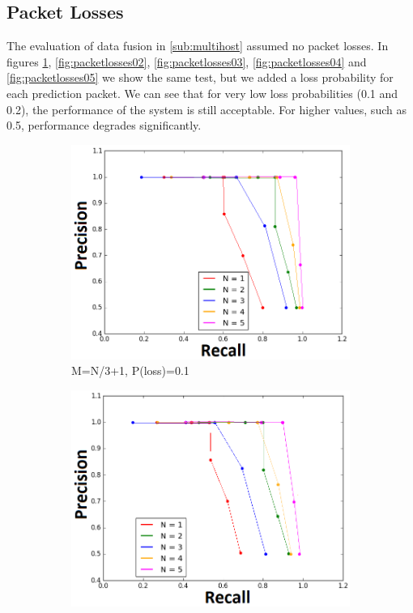 \documentclass[10pt,conference,compsocconf]{IEEEtran}
\begin{document}
\begin{enumerate}
\subsection{Packet Losses}
The evaluation of data fusion in \ref{sub:multihost} assumed no packet losses. In figures \ref{fig:packetlosses01}, \ref{fig:packetlosses02}, \ref{fig:packetlosses03}, \ref{fig:packetlosses04} and \ref{fig:packetlosses05} we show the same test, but we added a loss probability for each prediction packet. We can see that for very low loss probabilities (0.1 and 0.2), the performance of the system is still acceptable. For higher values, such as 0.5, performance degrades significantly.
\begin{figure}%
\begin{subfigure}{\textwidth}
  \centering
  \includegraphics[width=\linewidth]{img/THIRD_01_loss.png}
  \caption{M=N/3+1, P(loss)=0.1}
  \label{fig:packetlosses01}
\end{subfigure}%
\begin{subfigure}{\textwidth}
  \centering
  \includegraphics[width=\linewidth]{img/THIRD_02_loss.png}

\end{subfigure}
\end{figure}
\end{enumerate}
\end{document}
